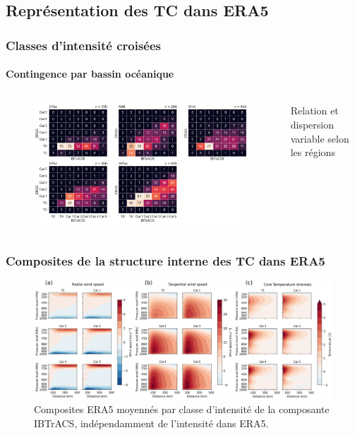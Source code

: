 \documentclass[aspectratio=169, usepdftitle=false, xcolor={dvipsnames}, 9pt,table]{beamer}
\begin{document}
\subsection*{Représentation des TC dans ERA5}
\begin{frame}[t]
    \frametitle{Classes d'intensité croisées}
    \framesubtitle{Contingence par bassin océanique}
    \begin{columns}
        \begin{column}{0.85\textwidth}
            \begin{figure}
                \centering
                \includegraphics[width=\textwidth]{Figures/Annexes/crosstable_region.png}
            \end{figure}
        \end{column}
        \begin{column}{0.15\textwidth}
            \scriptsize
            \begin{block}
               Relation et dispersion variable selon les régions 
            \end{block}
        \end{column}
    \end{columns}
\end{frame}

\begin{frame}[t]
    \frametitle{Composites de la structure interne des TC dans ERA5}
    \begin{figure}
        \centering
        \includegraphics[width=\textwidth]{Figures/Annexes/all_composites.png}
        \caption{\small Composites ERA5 moyennés par classe d'intensité de la composante IBTrACS, indépendamment de l'intensité dans ERA5.}
    \end{figure}
   
\end{frame}
\end{document}
